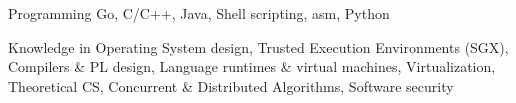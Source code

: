 


\begin{cvskills}


\cvskill
{Programming} %
{Go, C/C++, Java, Shell scripting, asm, Python} %

\cvskill
{}{}

\cvskill
{Knowledge in} %
{Operating System design, Trusted Execution Environments (SGX), Compilers \&
  PL design, Language runtimes \& virtual machines, Virtualization, Theoretical CS,
Concurrent \& Distributed Algorithms, Software security } %

\end{cvskills}
